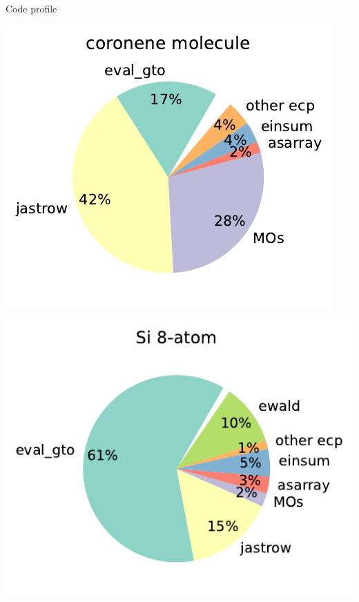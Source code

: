 \begin{frame}{Code profile}
\begin{minipage}{.45\textwidth}
\includegraphics[height=.45\textheight]{figures/profile_coronene.pdf}
\end{minipage}
\hspace{.02\textwidth}
\begin{minipage}{.45\textwidth}
\includegraphics[height=.45\textheight]{figures/profile_Si1.pdf}


\end{minipage}
\end{frame}
